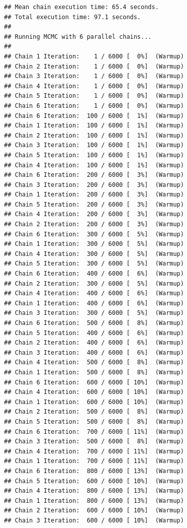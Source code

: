 \documentclass[
]{article}
\begin{document}
\begin{verbatim}
## Mean chain execution time: 65.4 seconds.
## Total execution time: 97.1 seconds.
## 
## Running MCMC with 6 parallel chains...
## 
## Chain 1 Iteration:    1 / 6000 [  0%]  (Warmup) 
## Chain 2 Iteration:    1 / 6000 [  0%]  (Warmup) 
## Chain 3 Iteration:    1 / 6000 [  0%]  (Warmup) 
## Chain 4 Iteration:    1 / 6000 [  0%]  (Warmup) 
## Chain 5 Iteration:    1 / 6000 [  0%]  (Warmup) 
## Chain 6 Iteration:    1 / 6000 [  0%]  (Warmup) 
## Chain 6 Iteration:  100 / 6000 [  1%]  (Warmup) 
## Chain 1 Iteration:  100 / 6000 [  1%]  (Warmup) 
## Chain 2 Iteration:  100 / 6000 [  1%]  (Warmup) 
## Chain 3 Iteration:  100 / 6000 [  1%]  (Warmup) 
## Chain 5 Iteration:  100 / 6000 [  1%]  (Warmup) 
## Chain 4 Iteration:  100 / 6000 [  1%]  (Warmup) 
## Chain 6 Iteration:  200 / 6000 [  3%]  (Warmup) 
## Chain 3 Iteration:  200 / 6000 [  3%]  (Warmup) 
## Chain 1 Iteration:  200 / 6000 [  3%]  (Warmup) 
## Chain 5 Iteration:  200 / 6000 [  3%]  (Warmup) 
## Chain 4 Iteration:  200 / 6000 [  3%]  (Warmup) 
## Chain 2 Iteration:  200 / 6000 [  3%]  (Warmup) 
## Chain 6 Iteration:  300 / 6000 [  5%]  (Warmup) 
## Chain 1 Iteration:  300 / 6000 [  5%]  (Warmup) 
## Chain 4 Iteration:  300 / 6000 [  5%]  (Warmup) 
## Chain 5 Iteration:  300 / 6000 [  5%]  (Warmup) 
## Chain 6 Iteration:  400 / 6000 [  6%]  (Warmup) 
## Chain 2 Iteration:  300 / 6000 [  5%]  (Warmup) 
## Chain 4 Iteration:  400 / 6000 [  6%]  (Warmup) 
## Chain 1 Iteration:  400 / 6000 [  6%]  (Warmup) 
## Chain 3 Iteration:  300 / 6000 [  5%]  (Warmup) 
## Chain 6 Iteration:  500 / 6000 [  8%]  (Warmup) 
## Chain 5 Iteration:  400 / 6000 [  6%]  (Warmup) 
## Chain 2 Iteration:  400 / 6000 [  6%]  (Warmup) 
## Chain 3 Iteration:  400 / 6000 [  6%]  (Warmup) 
## Chain 4 Iteration:  500 / 6000 [  8%]  (Warmup) 
## Chain 1 Iteration:  500 / 6000 [  8%]  (Warmup) 
## Chain 6 Iteration:  600 / 6000 [ 10%]  (Warmup) 
## Chain 4 Iteration:  600 / 6000 [ 10%]  (Warmup) 
## Chain 1 Iteration:  600 / 6000 [ 10%]  (Warmup) 
## Chain 2 Iteration:  500 / 6000 [  8%]  (Warmup) 
## Chain 5 Iteration:  500 / 6000 [  8%]  (Warmup) 
## Chain 6 Iteration:  700 / 6000 [ 11%]  (Warmup) 
## Chain 3 Iteration:  500 / 6000 [  8%]  (Warmup) 
## Chain 4 Iteration:  700 / 6000 [ 11%]  (Warmup) 
## Chain 1 Iteration:  700 / 6000 [ 11%]  (Warmup) 
## Chain 6 Iteration:  800 / 6000 [ 13%]  (Warmup) 
## Chain 5 Iteration:  600 / 6000 [ 10%]  (Warmup) 
## Chain 4 Iteration:  800 / 6000 [ 13%]  (Warmup) 
## Chain 1 Iteration:  800 / 6000 [ 13%]  (Warmup) 
## Chain 2 Iteration:  600 / 6000 [ 10%]  (Warmup) 
## Chain 3 Iteration:  600 / 6000 [ 10%]  (Warmup) 

\end{verbatim}
\end{document}
